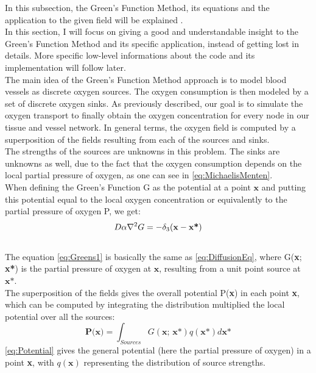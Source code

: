 In this subsection, the Green's Function Method, its equations and the application to the given field will be explained \cite{secomb1993analysis}.
\\In this section, I will focus on giving a good and understandable insight to the Green's Function Method and its specific application, instead of getting lost in details. More specific low-level informations about the code and its implementation will follow later.
\\The main idea of the Green's Function Method approach is to model blood vessels as discrete oxygen sources. The oxygen consumption is then modeled by a set of discrete oxygen sinks. As previously described, our goal is to simulate the oxygen transport to finally obtain the oxygen concentration for every node in our tissue and vessel network. In general terms, the oxygen field is computed by a superposition of the fields resulting from each of the sources and sinks.
\\The strengths of the sources are unknowns in this problem. The sinks are unknowns as well, due to the fact that the oxygen consumption depends on the local partial pressure of oxygen, as one can see in \ref{eq:MichaelisMenten}.
%
\\When defining the Green's Function G as the potential at a point $\textbf{x}$ and putting this potential equal to the local oxygen concentration or equivalently to the partial pressure of oxygen P, we get:
\begin{equation}
\\D\alpha\nabla^2G = - \delta_3 
( \textbf{x} - \textbf{x*} )
\label{eq:Greens1}
\end{equation}
\\The equation \ref{eq:Greens1} is basically the same as \ref{eq:DiffusionEq}, where G(\textbf{x}; \textbf{x*}) is the partial pressure of oxygen at $\textbf{x}$, resulting from a unit point source at $\textbf{x*}$.
%
\\The superposition of the fields gives the overall potential P(\textbf{x}) in each point \textbf{x}, which can be computed by integrating the distribution multiplied the local potential over all the sources:
\begin{equation}
\textbf{P(x)} = \int_{Sources} G(\textbf{x; x*})q(\textbf{x*})d\textbf{x*}
\label{eq:Potential}
\end{equation}
\ref{eq:Potential} gives the general potential (here the partial pressure of oxygen) in a point \textbf{x}, with $q(\textbf{x})$ representing the distribution of source strengths.
